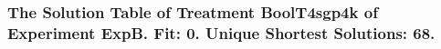  \begin{frame}
 \fontsize{8pt}{9pt}\selectfont
 \frametitle{ The Solution Table of Treatment BoolT4sgp4k of Experiment ExpB. Fit: 0. Unique Shortest Solutions: 68. }

 \label{ExpBSolutionTable022.tex}  
 \end{frame}

